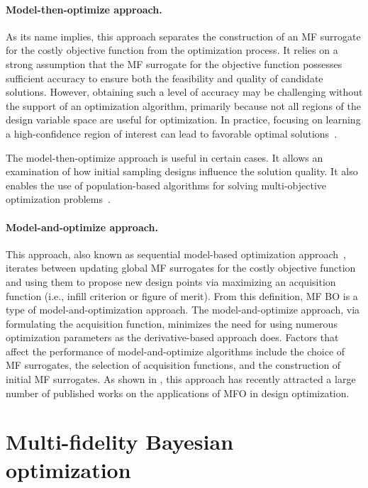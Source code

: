 \documentclass[journal ]{new-aiaa}
\begin{document}
	\paragraph{Model-then-optimize approach.}
	As its name implies, this approach separates the construction of an MF surrogate for the costly objective function from the optimization process.
	It relies on a strong assumption that the MF surrogate for the objective function possesses sufficient accuracy to ensure both the feasibility and quality of candidate solutions.
	However, obtaining such a level of accuracy may be challenging without the support of an optimization algorithm, primarily because not all regions of the design variable space are useful for optimization.
	In practice, focusing on learning a high-confidence region of interest can lead to favorable optimal solutions~\citep{ZhangF2023}.
	
	The model-then-optimize approach is useful in certain cases.
	It allows an examination of how initial sampling designs influence the solution quality.
	It also enables the use of population-based algorithms for solving multi-objective optimization problems~\citep{Viana2009,Leusink2015,Singh2017,Yang2018}.
	
	\paragraph{Model-and-optimize approach.}
	This approach, also known as sequential model-based optimization approach~\citep{Bossek2020}, iterates between updating global MF surrogates for the costly objective function and using them to propose new design points via maximizing an acquisition function (i.e., infill criterion or figure of merit).
	From this definition, MF BO is a type of model-and-optimization approach. 
	The model-and-optimize approach, via formulating the acquisition function, minimizes the need for using numerous optimization parameters as the derivative-based approach does.
	Factors that affect the performance of model-and-optimize algorithms include the choice of MF surrogates, the selection of acquisition functions, and the construction of initial MF surrogates.
	As shown in , this approach has recently attracted a large number of published works on the applications of MFO in design optimization.
	
	\section{Multi-fidelity Bayesian optimization}\label{Sec3}
	
\end{document}
